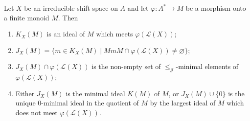 \documentclass[a4paper,UKenglish,numberwithinsect,cleveref]{lipics-v2021}
\newcommand{\JJ}{\mathrel{\mathscr{J}}}
\newcommand{\cL}{\mathcal L}
\begin{document}
\begin{proposition}\label{prop:Jclass}
    Let $X$ be an irreducible shift space on $A$ and let $\varphi\colon A^*\to M$ be a morphism onto a finite monoid $M$. Then 
    \begin{enumerate}
        \item $K_X(M)$ is an ideal  of $M$ which meets $\varphi(\cL(X))$;
            \label{Jclass-ideal}
        \item $J_X(M)=\{m\in K_X(M)\mid MmM\cap\varphi(\cL(X))\ne\varnothing\}$;
            \label{Jclass-intersect}
        \item $J_X(M)\cap\varphi(\cL(X))$ is the non-empty set of $\leq_{\JJ}$-minimal elements of $\varphi(\cL(X))$;
            \label{Jclass-J-minimal}
        \item Either $J_X(M)$ is the minimal ideal $K(M)$ of $M$, or $J_X(M)\cup\{0\}$ is the unique 0-minimal ideal in the quotient of $M$ by the largest ideal of $M$ which does not meet $\varphi(\cL(X))$. 
            \label{Jclass-min-ideal}
    \end{enumerate}
\end{proposition}
\end{document}
